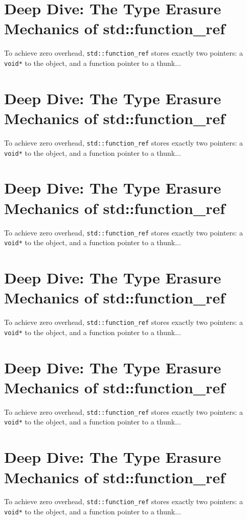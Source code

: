 \section{Deep Dive: The Type Erasure Mechanics of std::function_ref}
To achieve zero overhead, \texttt{std::function_ref} stores exactly two pointers: a \texttt{void*} to the object, and a function pointer to a thunk...

\section{Deep Dive: The Type Erasure Mechanics of std::function_ref}
To achieve zero overhead, \texttt{std::function_ref} stores exactly two pointers: a \texttt{void*} to the object, and a function pointer to a thunk...

\section{Deep Dive: The Type Erasure Mechanics of std::function_ref}
To achieve zero overhead, \texttt{std::function_ref} stores exactly two pointers: a \texttt{void*} to the object, and a function pointer to a thunk...

\section{Deep Dive: The Type Erasure Mechanics of std::function_ref}
To achieve zero overhead, \texttt{std::function_ref} stores exactly two pointers: a \texttt{void*} to the object, and a function pointer to a thunk...

\section{Deep Dive: The Type Erasure Mechanics of std::function_ref}
To achieve zero overhead, \texttt{std::function_ref} stores exactly two pointers: a \texttt{void*} to the object, and a function pointer to a thunk...

\section{Deep Dive: The Type Erasure Mechanics of std::function_ref}
To achieve zero overhead, \texttt{std::function_ref} stores exactly two pointers: a \texttt{void*} to the object, and a function pointer to a thunk...
